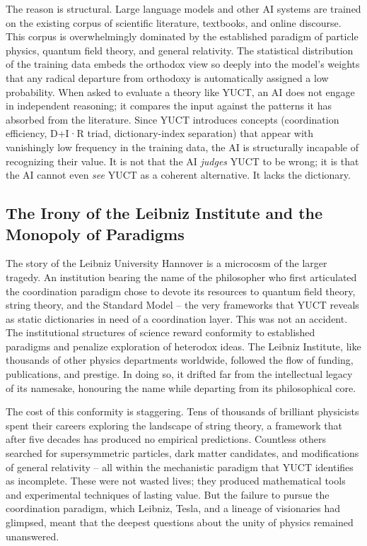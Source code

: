 \documentclass[12pt,a4paper]{article}
\begin{document}
	The reason is structural. Large language models and other AI systems are trained on the existing corpus of scientific literature, textbooks, and online discourse. This corpus is overwhelmingly dominated by the established paradigm of particle physics, quantum field theory, and general relativity. The statistical distribution of the training data embeds the orthodox view so deeply into the model's weights that any radical departure from orthodoxy is automatically assigned a low probability. When asked to evaluate a theory like YUCT, an AI does not engage in independent reasoning; it compares the input against the patterns it has absorbed from the literature. Since YUCT introduces concepts (coordination efficiency, D+I·R triad, dictionary-index separation) that appear with vanishingly low frequency in the training data, the AI is structurally incapable of recognizing their value. It is not that the AI \emph{judges} YUCT to be wrong; it is that the AI cannot even \emph{see} YUCT as a coherent alternative. It lacks the dictionary.
	
	\subsection{The Irony of the Leibniz Institute and the Monopoly of Paradigms}
	
	The story of the Leibniz University Hannover is a microcosm of the larger tragedy. An institution bearing the name of the philosopher who first articulated the coordination paradigm chose to devote its resources to quantum field theory, string theory, and the Standard Model -- the very frameworks that YUCT reveals as static dictionaries in need of a coordination layer. This was not an accident. The institutional structures of science reward conformity to established paradigms and penalize exploration of heterodox ideas. The Leibniz Institute, like thousands of other physics departments worldwide, followed the flow of funding, publications, and prestige. In doing so, it drifted far from the intellectual legacy of its namesake, honouring the name while departing from its philosophical core.
	
	The cost of this conformity is staggering. Tens of thousands of brilliant physicists spent their careers exploring the landscape of string theory, a framework that after five decades has produced no empirical predictions. Countless others searched for supersymmetric particles, dark matter candidates, and modifications of general relativity -- all within the mechanistic paradigm that YUCT identifies as incomplete. These were not wasted lives; they produced mathematical tools and experimental techniques of lasting value. But the failure to pursue the coordination paradigm, which Leibniz, Tesla, and a lineage of visionaries had glimpsed, meant that the deepest questions about the unity of physics remained unanswered.
	
\end{document}
